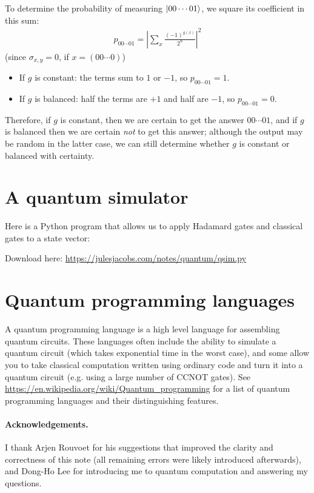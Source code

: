 To determine the probability of measuring $\ket{00\cdots01}$, we square its coefficient in this sum:
\begin{align*}
  p_{00\cdots01} =\left|\sum_x \frac{(-1)^{g(x)}}{2^n}\right|^2
\end{align*}
(since $\sigma_{x,y} = 0$, if $x = (00\cdots0)$)

\begin{itemize}
  \item If $g$ is constant: the terms sum to $1$ or $-1$, so $p_{00\cdots01} = 1$.
  \item If $g$ is balanced: half the terms are $+1$ and half are $-1$, so $p_{00\cdots01} = 0$.
\end{itemize}
Therefore, if $g$ is constant, then we are certain to get the answer $00\cdots01$,
and if $g$ is balanced then we are certain \emph{not} to get this answer;
although the output may be random in the latter case, we can still determine whether $g$ is constant or balanced with certainty.

\section{A quantum simulator}

Here is a Python program that allows us to apply Hadamard gates and classical gates to a state vector:


Download here: \url{https://julesjacobs.com/notes/quantum/qsim.py}

\section{Quantum programming languages}

A quantum programming language is a high level language for assembling quantum circuits.
These languages often include the ability to simulate a quantum circuit (which takes exponential time in the worst case),
and some allow you to take classical computation written using ordinary code and turn it into a quantum circuit (e.g. using a large number of CCNOT gates).
See \url{https://en.wikipedia.org/wiki/Quantum_programming} for a list of quantum programming languages and their distinguishing features.

\paragraph{Acknowledgements.}
I thank Arjen Rouvoet for his suggestions that improved the clarity and correctness of this note (all remaining errors were likely introduced afterwards),
and Dong-Ho Lee for introducing me to quantum computation and answering my questions.






